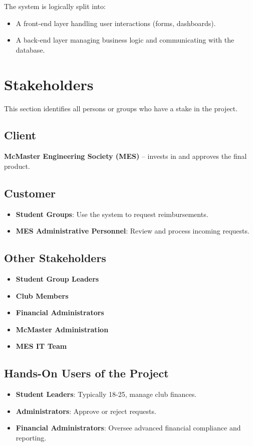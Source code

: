 \documentclass[12pt]{article}
\begin{document}
The system is logically split into:
\begin{itemize}
    \item A front-end layer handling user interactions (forms, dashboards).
    \item A back-end layer managing business logic and communicating with the database.
\end{itemize}

\section{Stakeholders}
This section identifies all persons or groups who have a stake in the project.

\subsection{Client}
\textbf{McMaster Engineering Society (MES)} -- invests in and approves the final product.

\subsection{Customer}
\begin{itemize}
    \item \textbf{Student Groups}: Use the system to request reimbursements.
    \item \textbf{MES Administrative Personnel}: Review and process incoming requests.
\end{itemize}

\subsection{Other Stakeholders}
\begin{itemize}
    \item \textbf{Student Group Leaders}
    \item \textbf{Club Members}
    \item \textbf{Financial Administrators}
    \item \textbf{McMaster Administration}
    \item \textbf{MES IT Team}
\end{itemize}

\subsection{Hands-On Users of the Project}
\begin{itemize}
    \item \textbf{Student Leaders}: Typically 18-25, manage club finances.
    \item \textbf{Administrators}: Approve or reject requests.
    \item \textbf{Financial Administrators}: Oversee advanced financial compliance and reporting.
\end{itemize}
\end{document}
